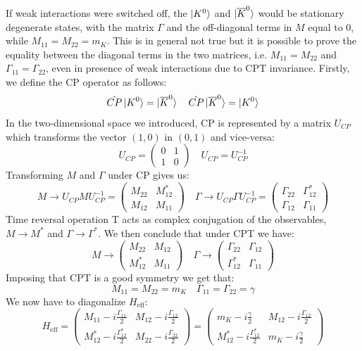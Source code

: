 \documentclass[../main.tex]{subfiles}
\begin{document}
If weak interactions were switched off, the $\ket{K^0}$ and $\ket{\overline{K}^0}$ would be stationary degenerate states, with the matrix $\Gamma$ and the off-diagonal terms in $M$ equal to 0, while $M_{11}=M_{22}=m_K$. This is in general not true but it is possible to prove the equality between the diagonal terms in the two matrices, i.e. $M_{11}=M_{22}$ and $\Gamma_{11}=\Gamma_{22}$, even in presence of weak interactions due to CPT invariance. Firstly, we define the CP operator as follows:
\[
\hat{CP}\ket{K^0}=\ket{\overline{K}^0} \quad \hat{CP}\ket{\overline{K}^0}=\ket{K^0}
\]
In the two-dimensional space we introduced, CP is represented by a matrix $U_{CP}$ which transforms the vector $(1,0)$ in $(0,1)$ and vice-versa:
\[
U_{CP}=\left(\begin{array}{cc}
    0 & 1 \\
    1 & 0
\end{array}\right) \quad U_{CP}=U_{CP}^{-1}
\]
Transforming $M$ and $\Gamma$ under CP gives us:
\[
M\to U_{CP}MU_{CP}^{-1}=\left(\begin{array}{cc}
    M_{22} & M_{12}^* \\
    M_{12} & M_{11}
\end{array}\right) \quad \Gamma\to U_{CP}\Gamma U_{CP}^{-1}=\left(\begin{array}{cc}
    \Gamma_{22} & \Gamma_{12}^* \\
    \Gamma_{12} & \Gamma_{11}
\end{array}\right)
\]
Time reversal operation T acts as complex conjugation of the observables, $M\to M^*$ and $\Gamma\to\Gamma^*$. We then conclude that under CPT we have:
\[
M\to\left(\begin{array}{cc}
    M_{22} & M_{12} \\
    M_{12}^* & M_{11}
\end{array}\right) \quad \Gamma\to\left(\begin{array}{cc}
    \Gamma_{22} & \Gamma_{12} \\
    \Gamma_{12}^* & \Gamma_{11}
\end{array}\right)
\]
Imposing that CPT is a good symmetry we get that:
\[
M_{11}=M_{22}=m_K \quad \Gamma_{11}=\Gamma_{22}=\gamma
\]
We now have to diagonalize $H_{\text{eff}}$:
\[
H_{\text{eff}}=\left(\begin{array}{cc}
    M_{11}-i\frac{\Gamma_{11}}{2} & M_{12}-i\frac{\Gamma_{12}}{2} \\
    M_{12}^*-i\frac{\Gamma_{12}^*}{2} & M_{22}-i\frac{\Gamma_{22}}{2}
\end{array}\right)=\left(\begin{array}{cc}
    m_K-i\frac{\gamma}{2} & M_{12}-i\frac{\Gamma_{12}}{2} \\
    M_{12}^*-i\frac{\Gamma_{12}^*}{2} & m_K-i\frac{\gamma}{2}
\end{array}\right)
\]
\end{document}
